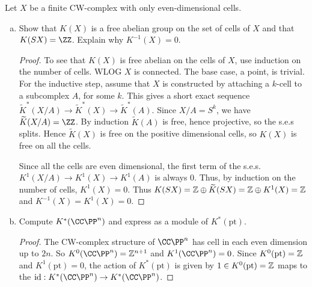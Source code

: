 \documentclass{article}
\begin{document}
 Let $X$ be a finite CW-complex with only even-dimensional cells.
\begin{enumerate}[a.]
\item Show that $K(X)$ is a free abelian group on the set of cells of $X$ and that $K(SX) = \ZZ$.  Explain why $K^{-1}(X) = 0$.
\begin{proof}
To see that $K(X)$ is free abelian on the cells of $X$, use induction on the number of cells. WLOG $X$ is connected. The base case, a point, is trivial.  For the inductive step, assume that $X$ is constructed by attaching a $k$-cell to a subcomplex $A$, for some $k$. This gives a short exact sequence
$\widetilde K^*(X/A) \to \widetilde  K^*(X) \to \widetilde  K^*(A)$.  
Since $X/A = S^k$, we have $\widetilde  K(X/A) = \ZZ$. By induction $\widetilde K(A)$ is free, hence projective, so the s.e.s splits.  Hence $\widetilde K(X)$ is free on the positive dimensional cells, so $K(X)$ is free on all the cells.


Since all the cells are even dimensional, the first term of the s.e.s. 
$K^1(X/A) \to K^1(X) \to K^1(A)$ is always 0. Thus, by induction on the number of cells, $K^1(X) = 0$. Thus $K(SX) = \mathbb{Z} \oplus \widetilde K(SX) = \mathbb{Z} \oplus K^1(X) = \mathbb{Z}$ and $K^{-1}(X) = K^1(X) = 0$.
\end{proof}


\item Compute $K^*(\CC\PP^n)$ and express as a module of $K^*(\text{pt})$.
\begin{proof}
The CW-complex structure of $\CC\PP^n$ has cell in each even dimension up to $2n$. So $K^0(\CC\PP^n) = \Z^{n+1}$ and $K^1(\CC\PP^n) = 0$.  Since $K^0(\text{pt}) = \mathbb{Z}$ and $K^1(\text{pt}) = 0$,  the action of $K^*(\text{pt})$ is given by $1 \in K^0(\text{pt}) = \mathbb{Z}$ maps to the $\id:K^*(\CC\PP^n) \to K^*(\CC\PP^n)$.
\end{proof}


\end{enumerate}
\end{document}
